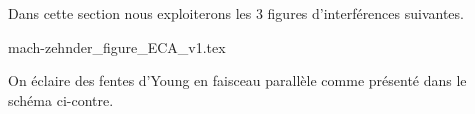 
\finEntrainement






Dans cette section nous exploiterons les 3 figures d'interférences suivantes.
\bigskip
\begin{center}
	{mach-zehnder_figure_ECA_v1.tex}
\end{center}

\hauteurLargeurCadreReponse		{6mm}{2.5cm}
\initialisationEntrainement

                                \initialisationPartieGauche %
On éclaire des fentes d'Young en faisceau parallèle comme présenté dans le schéma ci-contre.

